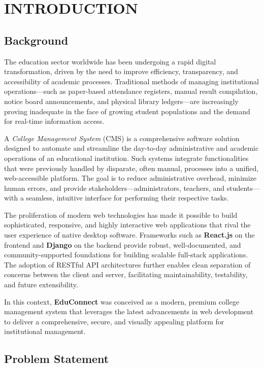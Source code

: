 \newpage
{}

\section{INTRODUCTION}
\hline

\subsection{Background}

The education sector worldwide has been undergoing a rapid digital transformation, driven by the need to improve efficiency, transparency, and accessibility of academic processes. Traditional methods of managing institutional operations---such as paper-based attendance registers, manual result compilation, notice board announcements, and physical library ledgers---are increasingly proving inadequate in the face of growing student populations and the demand for real-time information access.

A \textit{College Management System} (CMS) is a comprehensive software solution designed to automate and streamline the day-to-day administrative and academic operations of an educational institution. Such systems integrate functionalities that were previously handled by disparate, often manual, processes into a unified, web-accessible platform. The goal is to reduce administrative overhead, minimize human errors, and provide stakeholders---administrators, teachers, and students---with a seamless, intuitive interface for performing their respective tasks.

The proliferation of modern web technologies has made it possible to build sophisticated, responsive, and highly interactive web applications that rival the user experience of native desktop software. Frameworks such as \textbf{React.js} on the frontend and \textbf{Django} on the backend provide robust, well-documented, and community-supported foundations for building scalable full-stack applications. The adoption of RESTful API architectures further enables clean separation of concerns between the client and server, facilitating maintainability, testability, and future extensibility.

In this context, \textbf{EduConnect} was conceived as a modern, premium college management system that leverages the latest advancements in web development to deliver a comprehensive, secure, and visually appealing platform for institutional management.

\subsection{Problem Statement}

